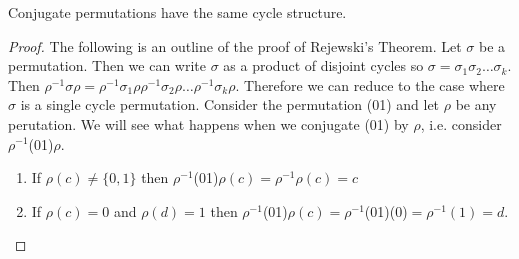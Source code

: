 \begin{theorem}Conjugate permutations have the same cycle structure. \end{theorem}

\begin{proof} The following is an outline of the proof of Rejewski's Theorem. Let $\sigma$ be a permutation. Then we can write $\sigma$ as a product of disjoint cycles so $\sigma = \sigma_1\sigma_2\dots\sigma_k$. Then $\rho^{-1} \sigma \rho = \rho^{-1} \sigma_1 \rho \rho^{-1} \sigma_2 \rho \dots \rho^{-1} \sigma_k \rho$. Therefore we can reduce to the case where $\sigma$ is a single cycle permutation. Consider the permutation (01) and let $\rho$ be any perutation. We will see what happens when we conjugate (01) by $\rho$, i.e. consider $\rho^{-1}$(01)$\rho$. \begin{enumerate}
\item If $\rho(c) \neq \{0,1\}$ then $\rho^{-1}$(01)$\rho(c) = \rho^{-1}\rho(c) = c$
\item If $\rho(c) = 0$ and $\rho(d) = 1$ then $\rho^{-1}$(01)$\rho(c) = \rho^{-1}$(01)(0)$ = \rho^{-1}(1) = d$.
\end{enumerate}
\end{proof}


